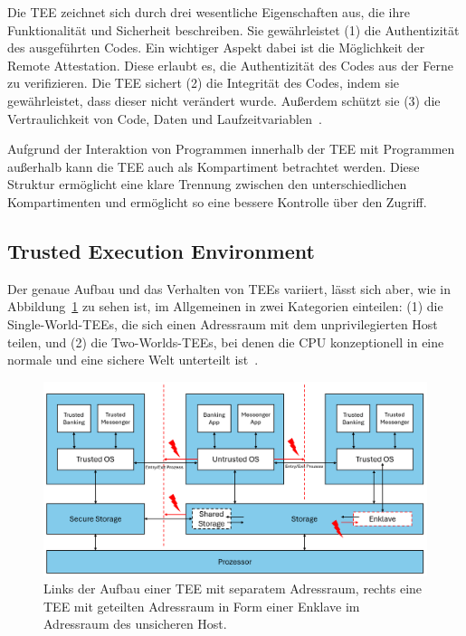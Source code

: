 Die TEE zeichnet sich durch drei wesentliche Eigenschaften aus, die ihre Funktionalität und Sicherheit beschreiben. 
Sie gewährleistet (1) die Authentizität des ausgeführten Codes.
Ein wichtiger Aspekt dabei ist die Möglichkeit der Remote Attestation. Diese erlaubt es, die Authentizität des Codes aus der Ferne zu verifizieren. 
Die TEE sichert (2) die Integrität des Codes, indem sie gewährleistet, dass dieser nicht verändert wurde. Außerdem schützt sie (3) die Vertraulichkeit von Code, Daten und Laufzeitvariablen~\cite{Trusted}.

Aufgrund der Interaktion von Programmen innerhalb der TEE mit Programmen außerhalb kann die TEE auch als Kompartiment betrachtet werden. Diese Struktur  ermöglicht eine klare Trennung zwischen den unterschiedlichen Kompartimenten und ermöglicht so eine bessere Kontrolle über den Zugriff.

\subsection{Trusted Execution Environment}
Der genaue Aufbau und das Verhalten von TEEs variiert, lässt sich aber, wie in Abbildung~\ref{fig:TEE} zu sehen ist, im Allgemeinen in zwei Kategorien einteilen: (1) die Single-World-TEEs, die sich einen Adressraum mit dem unprivilegierten Host teilen, und (2) die Two-Worlds-TEEs, bei denen die CPU konzeptionell in eine normale und eine sichere Welt unterteilt ist~\cite{TEEPaper}.

\begin{figure}[h]
    \centering
    \includegraphics[width=\linewidth]{Grafiken/TEE-Grafik.png}
    \caption{Links der Aufbau einer TEE mit separatem Adressraum, rechts eine TEE mit geteilten Adressraum in Form einer Enklave im Adressraum des unsicheren Host.}
    \label{fig:TEE}
\end{figure}

